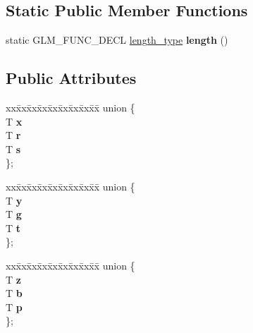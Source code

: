 \subsection*{Static Public Member Functions}
\begin{DoxyCompactItemize}
\item 
\mbox{\label{structglm_1_1tvec4_af5cc061d6e7bb66de7d0f3647728c9ff}} 
static G\+L\+M\+\_\+\+F\+U\+N\+C\+\_\+\+D\+E\+CL \hyperlink{structglm_1_1tvec4_a4e2b34a427cac7e72b6f73173c206feb}{length\+\_\+type} {\bfseries length} ()
\end{DoxyCompactItemize}
\subsection*{Public Attributes}
\begin{DoxyCompactItemize}
\item 
\mbox{\label{structglm_1_1tvec4_a058aaf9dba8266032caef0686a2777ce}} 
\begin{tabbing}
xx\=xx\=xx\=xx\=xx\=xx\=xx\=xx\=xx\=\kill
union \{\\
\>T {\bfseries x}\\
\>T {\bfseries r}\\
\>T {\bfseries s}\\
\}; \\

\end{tabbing}\item 
\mbox{\label{structglm_1_1tvec4_aebecbc7e409e978024d3611ed5ada592}} 
\begin{tabbing}
xx\=xx\=xx\=xx\=xx\=xx\=xx\=xx\=xx\=\kill
union \{\\
\>T {\bfseries y}\\
\>T {\bfseries g}\\
\>T {\bfseries t}\\
\}; \\

\end{tabbing}\item 
\mbox{\label{structglm_1_1tvec4_a3570caf095ed4e49789b8bcfb42186cb}} 
\begin{tabbing}
xx\=xx\=xx\=xx\=xx\=xx\=xx\=xx\=xx\=\kill
union \{\\
\>T {\bfseries z}\\
\>T {\bfseries b}\\
\>T {\bfseries p}\\
\}; \\


\end{tabbing}
\end{DoxyCompactItemize}
